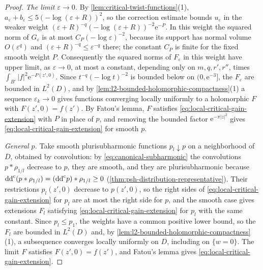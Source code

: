 \begin{proof}
\emph{The limit $\varepsilon\to0$.} By \cref{lem:critical-twist-functions}(1), $a_\varepsilon+b_\varepsilon\leq5(-\log(\varepsilon+R))^2$, so the correction estimate bounds $u_\varepsilon$ in the weaker weight $(\varepsilon+R)^{-q}(-\log(\varepsilon+R))^{-2}\mathrm e^{-P}$. In this weight the squared norm of $G_\varepsilon$ is at most $C_P(-\log\varepsilon)^{-2}$, because its support has normal volume $O(\varepsilon^q)$ and $(\varepsilon+R)^{-q}\leq\varepsilon^{-q}$ there; the constant $C_P$ is finite for the fixed smooth weight $P$. Consequently the squared norms of $F_\varepsilon$ in this weight have upper limit, as $\varepsilon\to0$, at most a constant, depending only on $m,q,r',r''$, times $\int_{B'}|f|^2\mathrm e^{-P(z',0)}$. Since $t^{-q}(-\log t)^{-2}$ is bounded below on $(0,\mathrm e^{-3}]$, the $F_\varepsilon$ are bounded in $L^2(D)$, and by \cref{lem:l2-bounded-holomorphic-compactness}(1) a sequence $\varepsilon_k\to0$ gives functions converging locally uniformly to a holomorphic $F$ with $F(z',0)=f(z')$. By Fatou's lemma, $F$ satisfies \eqref{eq:local-critical-gain-extension} with $P$ in place of $p$, and removing the bounded factor $\mathrm e^{-\pi|z|^2}$ gives \eqref{eq:local-critical-gain-extension} for smooth $p$.

\emph{General $p$.} Take smooth plurisubharmonic functions $p_l\downarrow p$ on a neighborhood of $\overline D$, obtained by convolution: by \eqref{eq:canonical-subharmonic} the convolutions $p*\rho_{1/l}$ decrease to $p$, they are smooth, and they are plurisubharmonic because $\mathrm{dd}^{\mathrm{c}}(p*\rho_{1/l})=(\mathrm{dd}^{\mathrm{c}} p)*\rho_{1/l}\geq0$ (\cref{thm:psh-distribution-representative}). Their restrictions $p_l(z',0)$ decrease to $p(z',0)$, so the right sides of \eqref{eq:local-critical-gain-extension} for $p_l$ are at most the right side for $p$, and the smooth case gives extensions $F_l$ satisfying \eqref{eq:local-critical-gain-extension} for $p_l$ with the same constant. Since $p_l\leq p_1$, the weights have a common positive lower bound, so the $F_l$ are bounded in $L^2(D)$ and, by \cref{lem:l2-bounded-holomorphic-compactness}(1), a subsequence converges locally uniformly on $D$, including on $\{w=0\}$. The limit $F$ satisfies $F(z',0)=f(z')$, and Fatou's lemma gives \eqref{eq:local-critical-gain-extension}.
\end{proof}

